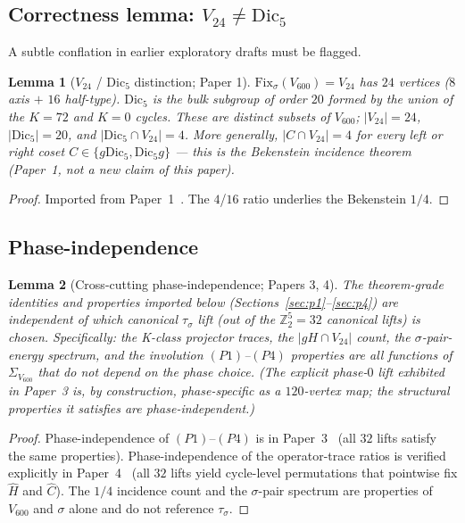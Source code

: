 \documentclass[11pt]{article}
\newtheorem{lemma}{Lemma}[section]
\theoremstyle{remark}
\newcommand{\Vsixhundred}{V_{600}}
\newcommand{\Dicfive}{\mathrm{Dic}_5}
\newcommand{\Vtwentyfour}{V_{24}}
\newcommand{\Sigmaspine}{\Sigma_{\Vsixhundred}}
\newcommand{\sigmaG}{\sigma}
\newcommand{\tausigma}{\tau_\sigma}
\begin{document}
\subsection{Correctness lemma: $\Vtwentyfour \neq \Dicfive$}

A subtle conflation in earlier exploratory drafts must be flagged.

\begin{lemma}[$\Vtwentyfour$ / $\Dicfive$ distinction; Paper 1]\label{lem:V24Dic5}
$\mathrm{Fix}_{\sigmaG}(\Vsixhundred) = \Vtwentyfour$ has $24$
vertices ($8$ axis $+$ $16$ half-type). $\Dicfive$ is the bulk
subgroup of order $20$ formed by the union of the $K=72$ and $K=0$
cycles. These are distinct subsets of $\Vsixhundred$;
$|\Vtwentyfour| = 24$, $|\Dicfive| = 20$, and
$|\Dicfive \cap \Vtwentyfour| = 4$. More generally,
$|C \cap \Vtwentyfour| = 4$ for every left or right coset
$C \in \{g\Dicfive, \Dicfive g\}$ --- this is the
Bekenstein incidence theorem (Paper~1, not a new claim of
this paper).
\end{lemma}

\begin{proof}
Imported from Paper~1~\citep{V600Paper1}. The $4$/$16$ ratio
underlies the Bekenstein $1/4$.
\end{proof}

\subsection{Phase-independence}

\begin{lemma}[Cross-cutting phase-independence; Papers 3, 4]\label{lem:phaseind}
The theorem-grade identities and properties imported below
(Sections~\ref{sec:p1}--\ref{sec:p4}) are independent of which
canonical $\tausigma$ lift (out of the $\mathbb{Z}_2^5 = 32$ canonical
lifts) is chosen. Specifically: the K-class projector traces, the
$|gH \cap \Vtwentyfour|$ count, the $\sigmaG$-pair-energy spectrum,
and the involution $(P1)$--$(P4)$ properties are all functions of
$\Sigmaspine$ that do not depend on the phase choice. (The explicit
phase-$0$ lift exhibited in Paper~3 is, by construction, phase-specific
as a $120$-vertex map; the structural properties it satisfies are
phase-independent.)
\end{lemma}

\begin{proof}
Phase-independence of $(P1)$--$(P4)$ is in
Paper~3~\citep{V600Paper3} (all $32$ lifts satisfy the same
properties). Phase-independence of the operator-trace ratios is
verified explicitly in Paper~4~\citep{V600Paper4} (all $32$ lifts
yield cycle-level permutations that pointwise fix $\hat H$ and
$\hat C$). The $1/4$ incidence count and the $\sigmaG$-pair
spectrum are properties of $\Vsixhundred$ and $\sigmaG$ alone and do
not reference $\tausigma$.
\end{proof}
\end{document}
